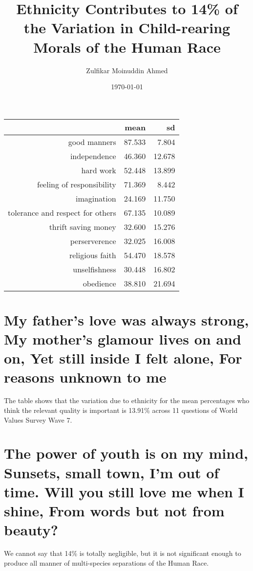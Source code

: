 \documentclass{amsart}
\title{Ethnicity Contributes to 14\% of the Variation in Child-rearing Morals of the Human Race}
\author{Zulfikar Moinuddin Ahmed}
\date{\today}
\begin{document}
\maketitle


\begin{table}[ht]
\centering
\begin{tabular}{rrr}
  \hline
 & mean & sd \\ 
  \hline
good manners & 87.533 & 7.804 \\ 
  independence & 46.360 & 12.678 \\ 
  hard work & 52.448 & 13.899 \\ 
  feeling of responsibility & 71.369 & 8.442 \\ 
  imagination & 24.169 & 11.750 \\ 
  tolerance and respect for others & 67.135 & 10.089 \\ 
  thrift saving money & 32.600 & 15.276 \\ 
  perserverence & 32.025 & 16.008 \\ 
  religious faith & 54.470 & 18.578 \\ 
  unselfishness & 30.448 & 16.802 \\ 
  obedience & 38.810 & 21.694 \\ 
   \hline
\end{tabular}
\end{table}


\section{My father's love was always strong,
My mother's glamour lives on and on,
Yet still inside I felt alone,
For reasons unknown to me}

The table shows that the variation due to ethnicity for the mean percentages who think the relevant quality is important is 13.91\% across 11 questions of World Values Survey Wave 7.

\section{The power of youth is on my mind,
Sunsets, small town, I'm out of time.
Will you still love me when I shine,
From words but not from beauty?}

We cannot say that 14\% is totally negligible, but it is not significant enough to produce all manner of multi-species separations of the Human Race.
\end{document}
